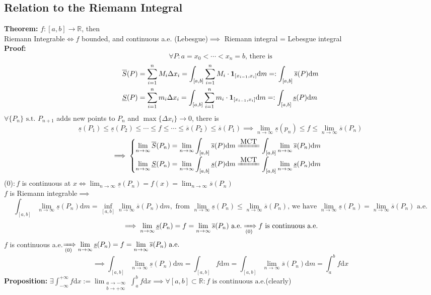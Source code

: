 \documentclass{article}
\newcommand{\R}{\mathbb{R}}
\newcommand{\sumin}{\displaystyle\sum_{i=1}^n}
\newcommand{\limninf}{\displaystyle\lim_{n\to\infty}}
\newcommand{\st}{\mbox{ s.t. }}
\newcommand{\0}{{\bf{0}}}
\newcommand{\1}{{\bf{1}}}
\newcommand{\alev}{\mbox{ a.e.}}
\newcommand{\dint}{\displaystyle\int}
\newcommand{\dlim}{\displaystyle\lim}
\newcommand{\dif}{\mbox{d}}
\begin{document}
\subsection{Relation to the Riemann Integral}
\textbf{Theorem:} $f:[a,b]\to\R$, then\\
Riemann Integrable$\iff f$ bounded, and continuous a.e. (Lebesgue)$\implies$ Riemann integral = Lebesgue integral\\
\textbf{Proof:}
$$\forall P:a=x_0<\cdots<x_n=b\mbox{, there is}$$
\begin{equation}
\begin{split}
    \overline{S}(P)&=\sumin M_i\Delta x_i=\int_{[a,b]}\sumin M_i\cdot\1_{[x_{i-1},x_i]}\dif m=:\int_{[a,b]}\overline{s}(P)\dif m\\
    \underline{S}(P)&=\sumin m_i\Delta x_i=\int_{[a,b]}\sumin m_i\cdot\1_{[x_{i-1},x_i]}\dif m=:\int_{[a,b]}\underline{s}(P)\dif m
\end{split}
\end{equation}
$\forall\{P_n\}\st P_{n+1}$ adds new points to $P_n$ and $\max\{\Delta x_i\}\to0$, there is 
$$\underline{s}(P_1)\le\underline{s}(P_2)\le\cdots\le f\le\cdots\le\overline{s}(P_2)\le\overline{s}(P_1)\implies\limninf\underline{s}(p_n)\le f\le\limninf\overline{s}(P_n)$$
$$\implies\begin{cases}
    \limninf\overline{S}(P_n)=\limninf\dint_{[a,b]}\overline{s}(P)\dif m\xlongequal{\mbox{MCT}}\dint_{[a,b]}\limninf\overline{s}(P_n)\dif m\\[8pt]
    \limninf\underline{S}(P_n)=\limninf\dint_{[a,b]}\underline{s}(P)\dif m\xlongequal{\mbox{MCT}}\dint_{[a,b]}\limninf\underline{s}(P_n)\dif m
\end{cases}$$
\null\hfill{(0):\,$f$ is continuous at $x\iff\limninf\underline{s}(P_n)=f(x)=\limninf\overline{s}(P_n)$}\\
$f$ is Riemann integrable$\implies$
$$\int_{[a,b]}\limninf\underline{s}(P_n)\dif m=\inf_{[a,b]}\limninf\overline{s}(P_n)\dif m,\mbox{ from }\limninf\underline{s}(P_n)\le\limninf\overline{s}(P_n)\mbox{, we have }\limninf\underline{s}(P_n)=\limninf\overline{s}(P_n)\alev$$
$$\implies\limninf\underline{s}(P_n)=f=\limninf\overline{s}(P_n)\alev\xRightarrow[(0)]{}f\mbox{ is continuous a.e.}$$
$f$ is continuous a.e.$\xRightarrow[(0)]{}\limninf\underline{s}(P_n)=f=\limninf\overline{s}(P_n)\alev$
$$\implies\int_{[a,b]}\limninf\underline{s}(P_n)\dif m=\int_{[a,b]}f\dif m=\int_{[a,b]}\limninf\overline{s}(P_n)\dif m=\int_a^bf\dif x$$
\textbf{Proposition:} $\exists\dint_{-\infty}^{+\infty}f\dif x:=\dlim_{\substack{a\to-\infty\\b\to+\infty}}\int_a^bf\dif x\implies\forall[a,b]\subset\R:f\mbox{ is continuous}\alev$\quad(clearly)\\
\end{document}
